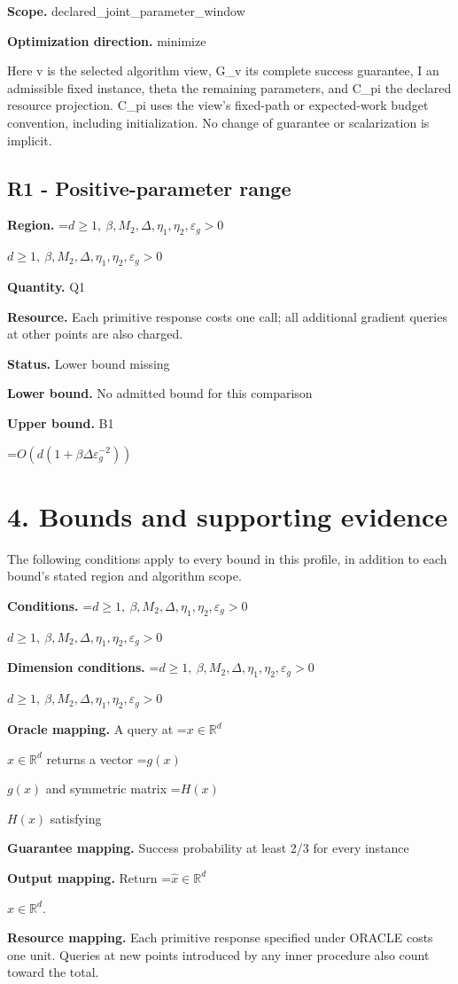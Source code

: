 \documentclass[10pt,a4paper]{article}
\newcommand{\AtlasMath}[1]{\par\begingroup\centering\setbox0=\hbox{$\displaystyle #1$}\ifdim\wd0>1.4\linewidth\typeout{ATLAS WIDE FORMULA: \the\wd0}\fi\ifdim\wd0>\linewidth\resizebox{\linewidth}{!}{\box0}\else\box0\fi\par\endgroup}
\newcommand{\AtlasInlineMath}[1]{\begingroup\setbox0=\hbox{$#1$}\ifdim\wd0>.4\linewidth\endgroup\AtlasMath{#1}\else\endgroup$#1$\fi}
\begin{document}
\textbf{Scope.} declared\_joint\_parameter\_window

\textbf{Optimization direction.} minimize

Here v is the selected algorithm view, G\_v its complete success guarantee, I an admissible fixed instance, theta the remaining parameters, and C\_pi the declared resource projection. C\_pi uses the view's fixed-path or expected-work budget convention, including initialization. No change of guarantee or scalarization is implicit.

\subsection{R1 - Positive-parameter range}
\textbf{Region.} \AtlasInlineMath{d\ge1,\ \beta,M_2,\Delta,\eta_1,\eta_2,\varepsilon_g>0}

\textbf{Quantity.} Q1

\textbf{Resource.} Each primitive response costs one call; all additional gradient queries at other points are also charged.

\textbf{Status.} Lower bound missing

\textbf{Lower bound.} No admitted bound for this comparison

\textbf{Upper bound.} B1

\AtlasMath{O(d(1+\beta\Delta\varepsilon_g^{-2}))}
\section{4. Bounds and supporting evidence}
The following conditions apply to every bound in this profile, in addition to each bound's stated region and algorithm scope.

\textbf{Conditions.} \AtlasInlineMath{d\ge1,\ \beta,M_2,\Delta,\eta_1,\eta_2,\varepsilon_g>0}

\textbf{Dimension conditions.} \AtlasInlineMath{d\ge1,\ \beta,M_2,\Delta,\eta_1,\eta_2,\varepsilon_g>0}

\textbf{Oracle mapping.} A query at \AtlasInlineMath{x\in\mathbb{R}^d} returns a vector \AtlasInlineMath{g(x)} and symmetric matrix \AtlasInlineMath{H(x)} satisfying

\textbf{Guarantee mapping.} Success probability at least 2/3 for every instance

\textbf{Output mapping.} Return \AtlasInlineMath{\widehat{x}\in \mathbb{R}^d}.

\textbf{Resource mapping.} Each primitive response specified under ORACLE costs one unit. Queries at new points introduced by any inner procedure also count toward the total.
\end{document}
